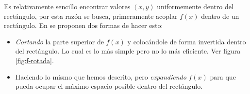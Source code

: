 % 
Es relativamente sencillo encontrar valores $(x,y)$ uniformemente dentro del rectángulo, por esta razón se busca, primeramente acoplar $f(x)$ dentro de un rectángulo.
En \parencite{Marsaglia-MontyPython} se proponen dos formas de hacer esto:
\begin{itemize}
    \item \textit{Cortando} la parte superior de $f(x)$ y colocándole de forma invertida dentro del rectángulo. Lo cual es lo más simple pero no lo más eficiente. Ver figura \ref{fig:f-rotada}.
    \item Haciendo lo mismo que hemos descrito, pero \textit{expandiendo} $f(x)$ para que pueda ocupar el máximo espacio posible dentro del rectángulo.
\end{itemize}
\begin{figure}[ht!]
    \centering
    \begin{subfigure}{0.45\textwidth}
\end{subfigure}
\end{figure}
